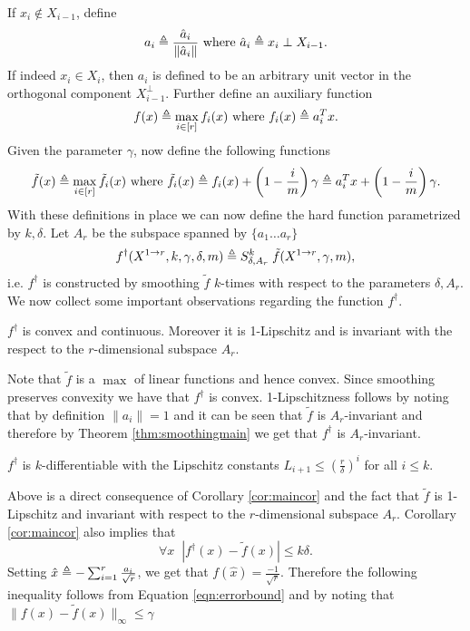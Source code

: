 \documentclass[final,12pt]{colt2018} %
\def\hardf{f^{\dagger}}
\def\tf{\tilde{f}}
\begin{document}
\noindent If $x_i \notin X_{i-1}$, define  
\[a_i \triangleq \frac{\hat{a}_i}{\| \hat{a}_i\|}\text{ where } \hat{a}_i \triangleq x_i \perp X_{i-1}.\]
If indeed $x_i \in X_i$, then $a_i$ is defined to be an arbitrary unit vector in the orthogonal component $X_{i-1}^{\perp}$. Further define an auxiliary function 
\[f(x) \triangleq \max_{i \in [r]} f_i(x) \text{ where } f_i(x) \triangleq a_i^T x.\]
Given the parameter $\gamma$, now define the following functions 
\[ \tilde{f}(x) \triangleq \max_{i \in [r]} \tilde{f}_i(x) \text{ where } \tilde{f}_i(x) \triangleq f_i(x) + \left(1 - \frac{i}{m} \right)\gamma \triangleq a_i^T x + \left(1 - \frac{i}{m} \right)\gamma.\]
With these definitions in place we can now define the hard function parametrized by $k, \delta$. Let $A_r$ be the subspace spanned by $\{a_1 \ldots a_r\}$
\begin{equation}
  \label{eqn:hardfdef}
  \hardf(X^{1 \rightarrow r}, k, \gamma, \delta, m) \defeq S^k_{\delta, A_r} \;\tilde{f}(X^{1 \rightarrow r}, \gamma, m),
\end{equation}
i.e. $\hardf$ is constructed by smoothing $\tilde{f}$ $k$-times with respect to the parameters $\delta, A_r$. We now collect some important observations regarding the function $\hardf$. 

\begin{observation}
  $\hardf$ is convex and continuous. Moreover it is 1-Lipschitz and is invariant with the respect to the $r$-dimensional subspace $A_r$.
\end{observation}

Note that $\tilde{f}$ is a $\max$ of linear functions and hence convex. Since smoothing preserves convexity we have that $\hardf$ is convex. 1-Lipschitzness follows by noting that by definition $\|a_i\| = 1$ and it can be seen that $\tilde{f}$ is $A_r$-invariant and therefore by Theorem \ref{thm:smoothingmain} we get that $\hardf$ is $A_r$-invariant. 


\begin{observation}
  $\hardf$ is $k$-differentiable with the Lipschitz constants $L_{i+1} \leq \left(\frac{r}{\delta}\right)^i$ for all $i \leq k$.
\end{observation}
\noindent Above is a direct consequence of Corollary \ref{cor:maincor} and the fact that $\tilde{f}$ is 1-Lipschitz and invariant with respect to the $r$-dimensional subspace $A_r$. 
Corollary \ref{cor:maincor} also implies that 
\begin{equation}
  \label{eqn:errorbound}
  \forall x \;\;|\hardf(x) - \tf(x)| \leq k\delta. 
\end{equation}
Setting $\hat{x} \triangleq -\sum_{i=1}^{r} \frac{a_i}{\sqrt{r}}$, we get that $f(\hat{x}) = \frac{-1}{\sqrt{r}}$. Therefore the following inequality follows from Equation \eqref{eqn:errorbound} and by noting that $\|f(x) - \tf(x)\|_{\infty} \leq \gamma$ 
\end{document}
